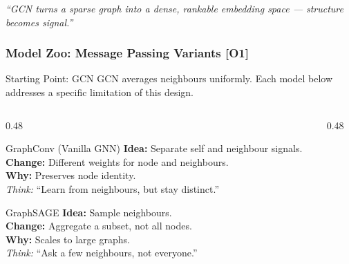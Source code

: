 \documentclass[10pt,aspectratio=43]{beamer}
\begin{document}
\begin{frame}
\vspace{0.2em}

\begin{block}{}
\small\centering
\textit{``GCN turns a sparse graph into a dense, rankable embedding space --- structure becomes signal.''}
\end{block}

\end{frame}

\begin{frame}
\frametitle{Model Zoo: Message Passing Variants \textbf{[O1]}}

\begin{block}{Starting Point: GCN}
\small
GCN averages neighbours uniformly.
Each model below addresses a \alert{specific limitation} of this design.
\end{block}

\vspace{0.25em}

\begin{columns}[T]

\begin{column}{0.48\textwidth}

\begin{exampleblock}{GraphConv (Vanilla GNN)}
\small
\textbf{Idea:} Separate self and neighbour signals.\\
\textbf{Change:} Different weights for node and neighbours.\\
\textbf{Why:} \alert{Preserves node identity}.\\
\textit{Think:} “Learn from neighbours, but stay distinct.”
\end{exampleblock}

\vspace{0.2em}

\begin{exampleblock}{GraphSAGE}
\small
\textbf{Idea:} Sample neighbours.\\
\textbf{Change:} Aggregate a subset, not all nodes.\\
\textbf{Why:} \alert{Scales to large graphs}.\\
\textit{Think:} “Ask a few neighbours, not everyone.”
\end{exampleblock}

\end{column}

\begin{column}{0.48\textwidth}


\end{column}
\end{columns}
\end{frame}
\end{document}
